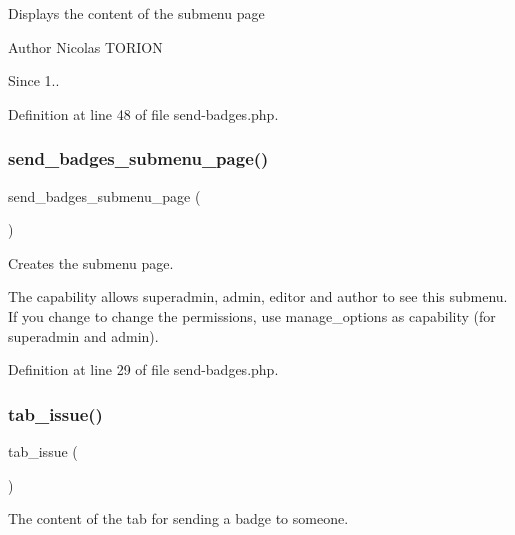 Displays the content of the submenu page

\begin{DoxyAuthor}{Author}
Nicolas T\+O\+R\+I\+ON 
\end{DoxyAuthor}
\begin{DoxySince}{Since}
1.. 
\end{DoxySince}


Definition at line 48 of file send-\/badges.\+php.

\mbox{\label{send-badges_8php_ae422f726cb1a2a17a82e59d61feab727}} 
\subsubsection{\texorpdfstring{send\+\_\+badges\+\_\+submenu\+\_\+page()}{send\_badges\_submenu\_page()}}
{\footnotesize\ttfamily send\+\_\+badges\+\_\+submenu\+\_\+page (\begin{DoxyParamCaption}{ }\end{DoxyParamCaption})}

Creates the submenu page.

The capability allows superadmin, admin, editor and author to see this submenu. If you change to change the permissions, use manage\+\_\+options as capability (for superadmin and admin). 

Definition at line 29 of file send-\/badges.\+php.

\mbox{\label{send-badges_8php_a0209048029fcb87785fc5c799516af97}} 
\subsubsection{\texorpdfstring{tab\+\_\+issue()}{tab\_issue()}}
{\footnotesize\ttfamily tab\+\_\+issue (\begin{DoxyParamCaption}{ }\end{DoxyParamCaption})}

The content of the tab for sending a badge to someone.

